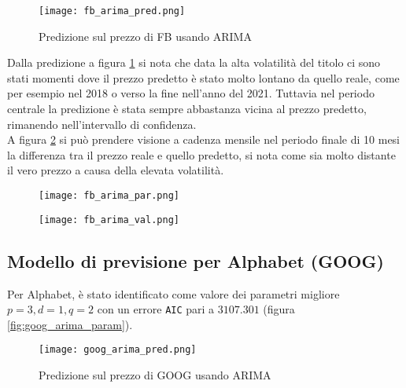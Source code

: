 \begin{figure}[ht]
    \centering
    \texttt{[image: fb\_arima\_pred.png]}
    \caption{Predizione sul prezzo di FB usando ARIMA}
    \label{fig:fb_arima_pred}
\end{figure}

Dalla predizione a figura \ref{fig:fb_arima_pred} si nota che data la alta volatilità del titolo ci sono stati momenti dove il prezzo predetto è stato molto lontano da quello reale,
come per esempio nel 2018 o verso la fine nell'anno del 2021.
Tuttavia nel periodo centrale la predizione è stata sempre abbastanza vicina al prezzo predetto, rimanendo nell'intervallo di confidenza.\\
A figura \ref{fig:fb_arima_val} si può prendere visione a cadenza mensile nel periodo finale di 10 mesi la differenza tra il prezzo reale e quello predetto, si nota come sia molto distante il vero prezzo a causa della elevata volatilità.

\begin{figure}[ht]
    \centering
    \begin{minipage}{.5\textwidth}
        \centering
        \vspace{1.68cm}
        \texttt{[image: fb\_arima\_par.png]}
        \label{fig:fb_arima_param}
    \end{minipage}%
    \begin{minipage}{.5\textwidth}
        \centering
        \texttt{[image: fb\_arima\_val.png]}
        \label{fig:fb_arima_val}
    \end{minipage}
\end{figure}

\pagebreak

\subsection{Modello di previsione per Alphabet (GOOG)}

Per Alphabet, è stato identificato come valore dei parametri migliore \(p=3, d=1, q=2\) con un errore \verb|AIC| pari a \(3107.301\) (figura \ref{fig:goog_arima_param}).

\begin{figure}[ht]
    \centering
    \texttt{[image: goog\_arima\_pred.png]}
    \caption{Predizione sul prezzo di GOOG usando ARIMA}
    \label{fig:goog_arima_pred}
\end{figure}


